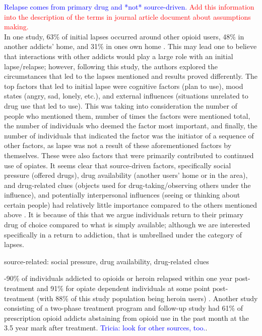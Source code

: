 \documentclass[12pt]{article}
\begin{document}
\textcolor{blue}{Relapse comes from primary drug and *not* source-driven.} \textcolor{red}{Add this information into the description of the terms in journal article document about assumptions making.} \\
In one study, 63\% of initial lapses occurred around other opioid users, 48\% in another addicts' home, and 31\% in ones own home \cite{Gossop1}. This may lead one to believe that interactions with other addicts would play a large role with an initial lapse/relapse; however, following this study, the authors explored the circumstances that led to the lapses mentioned and results proved differently. The top factors that led to initial lapse were cognitive factors (plan to use), mood states (angry, sad, lonely, etc.), and external influences (situations unrelated to drug use that led to use). This was taking into consideration the number of people who mentioned them, number of times the factors were mentioned total, the number of individuals who deemed the factor most important, and finally, the number of individuals that indicated the factor was the initiator of a sequence of other factors, as lapse was not a result of these aforementioned factors by themselves. These were also factors that were primarily contributed to continued use of opiates. It seems clear that source-driven factors, specifically social pressure (offered drugs), drug availability (another users' home or in the area), and drug-related clues (objects used for drug-taking/observing others under the influence), and potentially interpersonal influences (seeing or thinking about certain people) had relatively little importance compared to the others mentioned above \cite{Gossop2}. It is because of this that we argue individuals return to their primary drug of choice compared to what is simply available; although we are interested specifically in a return to addiction, that is umbrellaed under the category of lapses. 

source-related: social pressure, drug availability, drug-related clues 



-90\% of individuals addicted to opioids or heroin relapsed within one year post-treatment and 91\% for opiate dependent individuals at some point post-treatment (with 88\% of this study population being heroin users) \cite{Bailey, Smyth}. Another study consisting of a two-phase treatment program and follow-up study had 61\% of prescription opioid addicts abstaining from opioid use in the past month at the 3.5 year mark after treatment. \textcolor{blue}{Tricia: look for other sources, too.}. 
\end{document}
